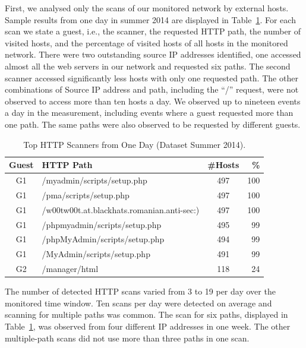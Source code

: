 First, we analysed only the scans of our monitored network by external hosts. Sample results from one day in summer 2014 are displayed in Table~\ref{tab:httpsecurity-scanners}. For each scan we state a guest, i.e., the scanner, the requested HTTP path, the number of visited hosts, and the percentage of visited hosts of all hosts in the monitored network. There were two outstanding source IP addresses identified, one accessed almost all the web servers in our network and requested six paths. The second scanner accessed significantly less hosts with only one requested path. The other combinations of Source IP address and path, including the ``/'' request, were not observed to access more than ten hosts a day. We observed up to nineteen events a day in the measurement, including events where a guest requested more than one path. The same paths were also observed to be requested by different guests.

\begin{table}[ht]
\centering
\begin{tabular}{| c | l | c | r |} \hline
Guest & HTTP Path & \#Hosts & \% \\ \hline
G1 & /myadmin/scripts/setup.php                 & 497 & 100 \\ \hline
G1 & /pma/scripts/setup.php                     & 497 & 100 \\ \hline
G1 & /w00tw00t.at.blackhats.romanian.anti-sec:) & 497 & 100 \\ \hline
G1 & /phpmyadmin/scripts/setup.php              & 495 &  99 \\ \hline
G1 & /phpMyAdmin/scripts/setup.php              & 494 &  99 \\ \hline
G1 & /MyAdmin/scripts/setup.php                 & 491 &  99 \\ \hline
G2 & /manager/html                              & 118 &  24 \\ \hline
\end{tabular}
\caption{Top HTTP Scanners from One Day (Dataset Summer 2014).}
\label{tab:httpsecurity-scanners}
\end{table}

The number of detected HTTP scans varied from 3 to 19 per day over the monitored time window. Ten scans per day were detected on average and scanning for multiple paths was common. The scan for six paths, displayed in Table~\ref{tab:httpsecurity-scanners}, was observed from four different IP addresses in one week. The other multiple-path scans did not use more than three paths in one scan.

